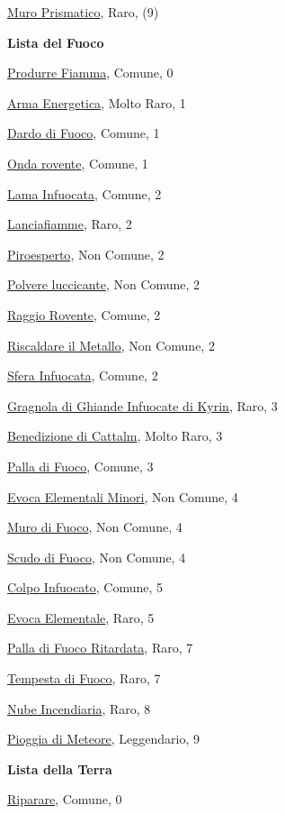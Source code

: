 \begin{multicols}{3}
{{\hyperlink{Muro Prismatico}{Muro Prismatico}, Raro, (9)

\medskip\textbf{Lista del Fuoco}

\hyperlink{Produrre Fiamma}{Produrre Fiamma}, Comune, 0

\hyperlink{Arma Energetica}{Arma Energetica}, Molto Raro, 1

\hyperlink{Dardo di Fuoco}{Dardo di Fuoco}, Comune, 1

\hyperlink{Onda rovente}{Onda rovente}, Comune, 1

\hyperlink{Lama Infuocata}{Lama Infuocata}, Comune, 2

\hyperlink{Lanciafiamme}{Lanciafiamme}, Raro, 2

\hyperlink{Piroesperto}{Piroesperto}, Non Comune, 2

\hyperlink{Polvere luccicante}{Polvere luccicante}, Non Comune, 2

\hyperlink{Raggio Rovente}{Raggio Rovente}, Comune, 2

\hyperlink{Riscaldare il Metallo}{Riscaldare il Metallo}, Non Comune, 2

\hyperlink{Sfera Infuocata}{Sfera Infuocata}, Comune, 2

\hyperlink{Gragnola di Ghiande Infuocate di Kyrin}{Gragnola di Ghiande Infuocate di Kyrin}, Raro, 3

\hyperlink{Benedizione di Cattalm}{Benedizione di Cattalm}, Molto Raro, 3

\hyperlink{Palla di Fuoco}{Palla di Fuoco}, Comune, 3

\hyperlink{Evoca Elementali Minori}{Evoca Elementali Minori}, Non Comune, 4

\hyperlink{Muro di Fuoco}{Muro di Fuoco}, Non Comune, 4

\hyperlink{Scudo di Fuoco}{Scudo di Fuoco}, Non Comune, 4

\hyperlink{Colpo Infuocato}{Colpo Infuocato}, Comune, 5

\hyperlink{Evoca Elementale}{Evoca Elementale}, Raro, 5

\hyperlink{Palla di Fuoco Ritardata}{Palla di Fuoco Ritardata}, Raro, 7

\hyperlink{Tempesta di Fuoco}{Tempesta di Fuoco}, Raro, 7

\hyperlink{Nube Incendiaria}{Nube Incendiaria}, Raro, 8

\hyperlink{Pioggia di Meteore}{Pioggia di Meteore}, Leggendario, 9

\medskip\textbf{Lista della Terra}

\hyperlink{Riparare}{Riparare}, Comune, 0

}}
\end{multicols}
